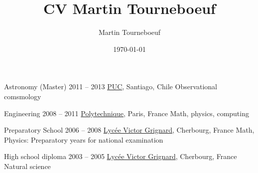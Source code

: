 \def\tbflanguage{english}
\def\tbfbordertop{1}
\def\tbfborderleft{0.7}

\ifx\HCode\undefined

%
\else

\fi

\title{CV Martin Tourneboeuf}
\author{Martin Tourneboeuf}
\date{\today}




\ifx\HCode\undefined \else
\maketitle
\fi







\begin{coordinatelist}
\end{coordinatelist}




\begin{yearlist}[7.7][\tbfborderleft][4]


\item[Astronomy (Master)]{2011 -- 2013}
  {
  \href{http://www.uc.cl/}{PUC}, Santiago, Chile
  }
  {   Observational comsmology}


\item[Engineering]{2008 -- 2011}
  {
  \href{https://www.polytechnique.edu/}{Polytechnique}, Paris, France
  }
  {    Math, physics, computing}


\item[Preparatory School]{2006 -- 2008}
  {
  \href{http://www.lycee-grignard.fr/}{Lyc\'ee Victor Grignard}, Cherbourg, France
  }
  {    Math, Physics: Preparatory years for national examination}


\item[High school diploma]{2003 -- 2005}
  {
  \href{http://www.lycee-grignard.fr/}{Lyc\'ee Victor Grignard}, Cherbourg, France
  }
  {    Natural science}

\end{yearlist}



